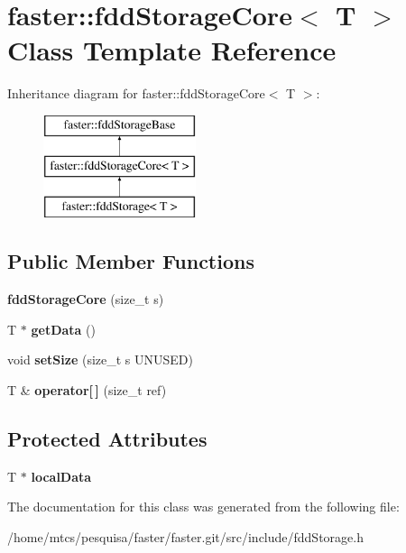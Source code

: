 \hypertarget{classfaster_1_1fddStorageCore}{}\section{faster\+:\+:fdd\+Storage\+Core$<$ T $>$ Class Template Reference}
\label{classfaster_1_1fddStorageCore}
Inheritance diagram for faster\+:\+:fdd\+Storage\+Core$<$ T $>$\+:\begin{figure}[H]
\begin{center}
\leavevmode
\includegraphics[height=3.000000cm]{classfaster_1_1fddStorageCore}
\end{center}
\end{figure}
\subsection*{Public Member Functions}
\begin{DoxyCompactItemize}
\item 
\hypertarget{classfaster_1_1fddStorageCore_aaae0b252366d73dec3995251fdc75920}{}{\bfseries fdd\+Storage\+Core} (size\+\_\+t s)\label{classfaster_1_1fddStorageCore_aaae0b252366d73dec3995251fdc75920}

\item 
\hypertarget{classfaster_1_1fddStorageCore_a7f59035016c0ac09c646c37096d6318d}{}T $\ast$ {\bfseries get\+Data} ()\label{classfaster_1_1fddStorageCore_a7f59035016c0ac09c646c37096d6318d}

\item 
\hypertarget{classfaster_1_1fddStorageCore_a6bf9e9e16bdcaf4164ac5a3d28848ec0}{}void {\bfseries set\+Size} (size\+\_\+t s U\+N\+U\+S\+E\+D)\label{classfaster_1_1fddStorageCore_a6bf9e9e16bdcaf4164ac5a3d28848ec0}

\item 
\hypertarget{classfaster_1_1fddStorageCore_a12ee2387f15a1b80fad639ffef906b2d}{}T \& {\bfseries operator\mbox{[}$\,$\mbox{]}} (size\+\_\+t ref)\label{classfaster_1_1fddStorageCore_a12ee2387f15a1b80fad639ffef906b2d}

\end{DoxyCompactItemize}
\subsection*{Protected Attributes}
\begin{DoxyCompactItemize}
\item 
\hypertarget{classfaster_1_1fddStorageCore_af2b22b0cda86b521472708991c38b797}{}T $\ast$ {\bfseries local\+Data}\label{classfaster_1_1fddStorageCore_af2b22b0cda86b521472708991c38b797}

\end{DoxyCompactItemize}


The documentation for this class was generated from the following file\+:\begin{DoxyCompactItemize}
\item 
/home/mtcs/pesquisa/faster/faster.\+git/src/include/fdd\+Storage.\+h\end{DoxyCompactItemize}
